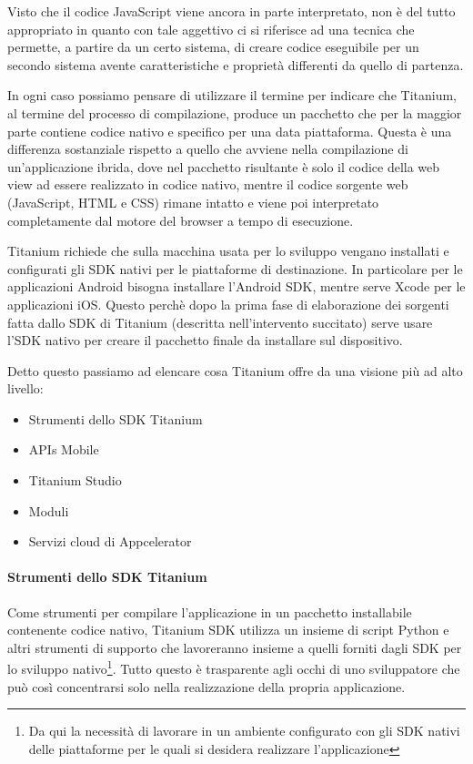 			Visto che il codice JavaScript viene ancora in parte interpretato, 
			\crosscomp{} non è del tutto appropriato in quanto con tale 
			aggettivo ci si riferisce ad una tecnica che permette, a partire da 
			un certo sistema, di creare codice eseguibile per un secondo sistema 
			avente caratteristiche e proprietà differenti da quello di 
			partenza\citep{Web:Wiki.cross-compiling}.
			
			In ogni caso possiamo pensare di utilizzare il termine 
			\crosscomp{} per indicare che Titanium, al termine del processo di 
			compilazione, produce un pacchetto che per la 
			maggior parte contiene codice nativo e specifico per una data 
			piattaforma. Questa è una differenza sostanziale rispetto a quello 
			che avviene nella compilazione di un'applicazione ibrida, dove nel 
			pacchetto risultante è solo il codice della web view ad essere 
			realizzato in codice nativo, mentre il codice sorgente web 
			(JavaScript, HTML e CSS) rimane intatto e viene poi interpretato 
			completamente dal motore del browser a tempo di esecuzione.
			
			Titanium richiede che sulla macchina usata per lo sviluppo vengano 
			installati e configurati gli SDK nativi per le piattaforme di 
			destinazione. In particolare per le applicazioni Android bisogna 
			installare l'Android SDK, mentre serve Xcode per le applicazioni 
			iOS. Questo perchè dopo la prima fase di elaborazione dei sorgenti 
			fatta dallo SDK di Titanium (descritta nell'intervento succitato) 
			serve usare l'SDK nativo per creare il pacchetto finale da 
			installare sul dispositivo.
			
			\clearpage
			\noindent Detto questo passiamo ad elencare cosa Titanium offre da 
			una visione più ad alto livello\citep[Cap.2 - Titanium 
			Mobile Overview]{Book:Ti}:
			\begin{itemize}
				\item Strumenti dello SDK Titanium
				\item APIs Mobile
				\item Titanium Studio
				\item Moduli
				\item Servizi cloud di Appcelerator
			\end{itemize}
	
			\paragraph{Strumenti dello SDK Titanium}
				Come strumenti per compilare l'applicazione in un pacchetto 
				installabile contenente codice nativo, Titanium SDK utilizza un 
				insieme di script Python e altri strumenti di supporto che 
				lavoreranno insieme a quelli forniti dagli SDK per lo sviluppo 
				nativo\footnote{Da qui la necessità di lavorare in un ambiente 
				configurato con gli SDK nativi delle piattaforme per le quali si 
				desidera realizzare l'applicazione}. Tutto questo è trasparente 
				agli occhi di uno sviluppatore che può così concentrarsi solo 
				nella realizzazione della propria applicazione.
				
